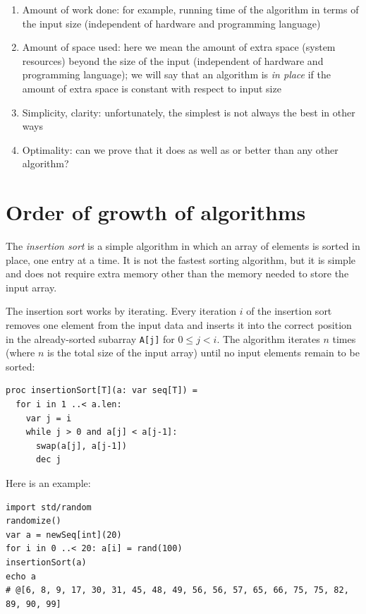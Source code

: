 \documentclass[justified, sixbynine]{tufte-book}
\def\ft{\small\tt}
\theoremstyle{plain}%
\newtheorem * {corollary}{Corollary}
\theoremstyle{definition}
\theoremstyle{remark}
\newtheorem * {remark}{Remark}
\newtheorem * {note}{Note}
\begin{document}
\begin{fullwidth}
\begin{enumerate}
\item  Amount of work done: for example, running time of the algorithm in terms of
the input size (independent of hardware and programming language)

\item  Amount of space used: here we mean the amount of extra space (system resources) beyond
the size of the input (independent of hardware and programming language);
we will say that an algorithm is {\em in place} if the amount of extra space
is constant with respect to input size

\item  Simplicity, clarity: unfortunately, the simplest is not always the
best in other ways

\item  Optimality: can we prove that it does as well as or better than any other algorithm?
\end{enumerate}

\goodbreak\section{Order of growth of algorithms}

\index{$\Theta$}\index{$\Omega$}\index{$\omega$}


The {\it insertion sort} is a simple algorithm in which an array of elements is sorted in place, one entry at a time. It is not the fastest sorting algorithm, but it is simple and does not require extra memory other than the memory needed to store the input array.

The insertion sort works by iterating. Every iteration $i$ of the insertion sort removes one element from the input data and inserts it into the correct position in the already-sorted subarray {\ft A[j]} for $0 \le j < i$. The algorithm iterates $n$ times (where $n$ is the total size of the input array) until no input elements remain to be sorted:

\begin{lstlisting}
proc insertionSort[T](a: var seq[T]) =
  for i in 1 ..< a.len:
    var j = i
    while j > 0 and a[j] < a[j-1]:
      swap(a[j], a[j-1])
      dec j
\end{lstlisting}

Here is an example:

\begin{lstlisting}
import std/random
randomize()
var a = newSeq[int](20)
for i in 0 ..< 20: a[i] = rand(100)
insertionSort(a)
echo a
# @[6, 8, 9, 17, 30, 31, 45, 48, 49, 56, 56, 57, 65, 66, 75, 75, 82, 89, 90, 99]
\end{lstlisting}


\end{fullwidth}
\end{document}

